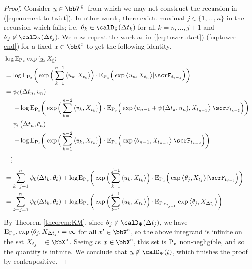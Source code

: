 \begin{proof}
  \label{proof:proposition:moment-to-twist}
  Consider $\underline\momentVar \in \vecSpace^{|\underline t|}$ from which we may not construct the recursion in (\ref{eq:moment-to-twist}).
  In other words, there exists maximal $j \in \{1, \ldots, n\}$ in the recursion which fails; i.e.\ $\twistVar_k \in \momentSpace(\Delta t_k)$ for all $k = n, \ldots, j+1$ and $\twistVar_j \not\in\momentSpace(\Delta t_j)$.
  We now repeat the work as in (\ref{eq:tower-start})-(\ref{eq:tower-end}) for a fixed $\stateVar \in \stateSpace^\circ$ to get the following identity.
  \begin{align*}
    &\log\Exp_{\Prb_\stateVar}\exp\prj{\underline\momentVar}{\X_{\underline t}} \\
    &= \log\Exp_{\Prb_\stateVar}\bigg( \exp\Big(\sum_{k=1}^{n-1} \prj{\momentVar_k}{\X_{t_k}}\Big) \cdot \Exp_{\Prb_\stateVar}\Big( \exp\bprj{\momentVar_n}{\X_{t_n}} |\scrF_{t_{n-1}} \Big) \bigg) \\
    &= \begin{aligned}[t]
      &\affPart_0(\Delta t_n, \momentVar_n) \\
      &+ \log\Exp_{\Prb_\stateVar}\bigg( \exp\Big(\sum_{k=1}^{n-2} \prj{\momentVar_k}{\X_{t_k}}\Big) \cdot \Exp_{\Prb_\stateVar}\Big( \exp\bprj{\momentVar_{n-1} + \affPart(\Delta t_n, \momentVar_n)}{\X_{t_{n-1}}} | \scrF_{t_{n-2}} \Big)  \bigg) 
    \end{aligned} \\
    &= \begin{aligned}[t]
      &\affPart_0\big(\Delta t_n, \twistVar_n) \\
      &+ \log\Exp_{\Prb_\stateVar}\bigg( \exp\Big(\sum_{k=1}^{n-2} \prj{\momentVar_k}{\X_{t_k}}\Big) \cdot \Exp_{\Prb_\stateVar}\Big( \exp\bprj{\twistVar_{n-1}}{\X_{t_{n-1}}} | \scrF_{t_{n-2}} \Big)  \bigg) 
    \end{aligned} \\
    & \quad\vdots \\
    &= \sum_{k=j+1}^n \affPart_0(\Delta t_k, \twistVar_k) + \log\Exp_{\Prb_\stateVar}\bigg( \exp\Big(\sum_{k=1}^{j-1} \prj{\momentVar_k}{\X_{t_k}}\Big) \cdot \Exp_{\Prb_\stateVar}\Big( \exp\bprj{\twistVar_j}{\X_{t_j}} |\scrF_{t_{j-1}} \Big) \bigg) \\
    &= \sum_{k=j+1}^n \affPart_0(\Delta t_k, \twistVar_k) + \log\Exp_{\Prb_\stateVar}\bigg( \exp\Big(\sum_{k=1}^{j-1} \prj{\momentVar_k}{\X_{t_k}}\Big) \cdot \Exp_{\Prb_{\X_{t_{j-1}}}} \exp\bprj{\twistVar_j}{\X_{\Delta t_j}} \bigg)
  \end{align*}
  By Theorem \ref{theorem:KM}, since $\twistVar_j \not\in \momentSpace(\Delta t_j)$, we have ${\operatorname{E}}_{{\operatorname{P}}_{x'}} \exp{\langle \theta_j , X_{\Delta t_j} \rangle} = \infty$ for all $\stateVar' \in \stateSpace^\circ$, so the above integrand is infinite on the set $\X_{t_{j-1}} \in \stateSpace^\circ$.
  Seeing as $\stateVar \in \stateSpace^\circ$, this set is ${\operatorname{P}}_x$ non-negligible, and so the quantity is infinite.
  We conclude that $\underline\momentVar \not\in \momentSpace(\underline t)$, which finishes the proof by contrapositive.
\end{proof}
